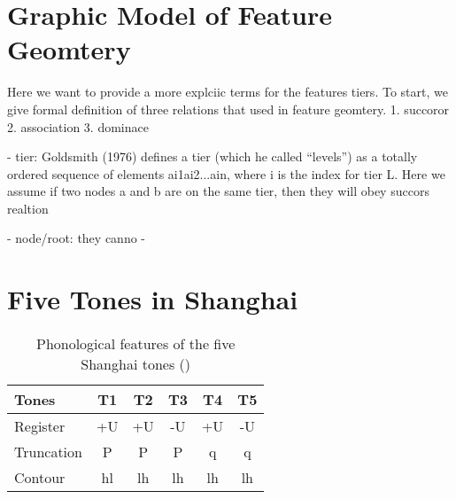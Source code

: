 \documentclass[11pt]{article}
\begin{document}
\section{Graphic Model of Feature Geomtery}
Here we want to provide a more explciic terms for the features tiers. To start, we give formal definition of three
relations that used in feature geomtery.
1. succoror
2. association
3. dominace

- tier: Goldsmith (1976) defines a tier (which he called “levels”) as a totally ordered  sequence of elements ai1ai2...ain, where i is the index for tier L. Here we assume if two nodes a and b are on the same tier, then they will obey succors realtion

- node/root: they canno
- 
\hfill
{}


\section{Five Tones in Shanghai}

\begin{table}[h!]
	\centering
	\caption{Phonological features of the five Shanghai tones (\citep{zhu1999shanghai})} 
	\begin{tabular}{lccccc}
		\toprule
		\textbf{Tones} & \textbf{T1} & \textbf{T2} & \textbf{T3} & \textbf{T4} & \textbf{T5} \\
		\midrule
		Register   & +U & +U & -U & +U & -U \\
		Truncation & P  & P  & P  & q  & q  \\
		Contour    & hl & lh & lh & lh & lh \\
		\bottomrule
	\end{tabular}
\end{table}




\end{document}
